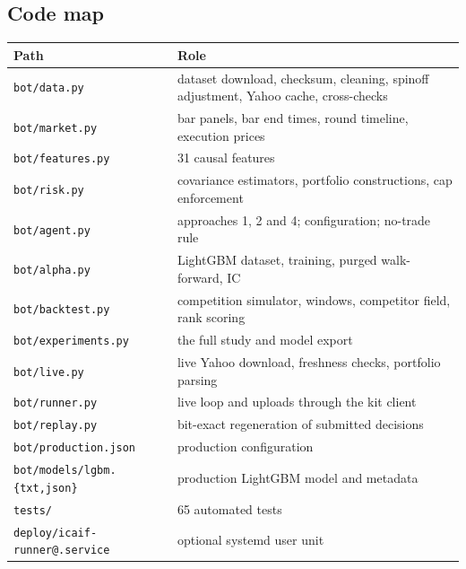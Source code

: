 \documentclass[11pt,a4paper]{article}
\newcommand{\code}[1]{\texttt{#1}}
\begin{document}
\subsection{Code map}
\begin{center}\small
\begin{tabularx}{\linewidth}{lX}
\toprule
Path & Role \\
\midrule
\code{bot/data.py} & dataset download, checksum, cleaning, spinoff adjustment, Yahoo cache, cross-checks \\
\code{bot/market.py} & bar panels, bar end times, round timeline, execution prices \\
\code{bot/features.py} & 31 causal features \\
\code{bot/risk.py} & covariance estimators, portfolio constructions, cap enforcement \\
\code{bot/agent.py} & approaches 1, 2 and 4; configuration; no-trade rule \\
\code{bot/alpha.py} & LightGBM dataset, training, purged walk-forward, IC \\
\code{bot/backtest.py} & competition simulator, windows, competitor field, rank scoring \\
\code{bot/experiments.py} & the full study and model export \\
\code{bot/live.py} & live Yahoo download, freshness checks, portfolio parsing \\
\code{bot/runner.py} & live loop and uploads through the kit client \\
\code{bot/replay.py} & bit-exact regeneration of submitted decisions \\
\code{bot/production.json} & production configuration \\
\code{bot/models/lgbm.\{txt,json\}} & production LightGBM model and metadata \\
\code{tests/} & 65 automated tests \\
\code{deploy/icaif-runner@.service} & optional systemd user unit \\
\bottomrule
\end{tabularx}
\end{center}

\end{document}
